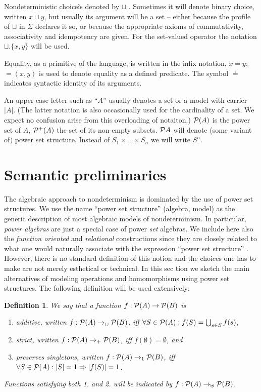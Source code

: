 \documentclass[10pt]{article}
\newcommand{\ch}{\sqcup}
\newcommand{\Car}[1]{|#1|}
\newcommand{\PSet}{{\cal P}}
\newcommand{\impl}{\mathrel{\Rightarrow}}
\newcommand{\into}{\mathrel{\rightarrow}}
\newcommand{\addinto}{\mathrel{\rightarrow_{\cup}}}
\newcommand{\strinto}{\mathrel{\rightarrow_{+}}}
\newcommand{\singinto}{\mathrel{\rightarrow_{1}}}
\newcommand{\addstrinto}{\mathrel{\rightarrow_{\uplus}}}
\newcommand{\es}{\emptyset}
\newcommand{\MyLPar}{\parsep -.2ex plus.2ex minus.2ex\itemsep\parsep 
\vspace{-\topsep}\vspace{.5ex}}
\newenvironment{enum}{\begin{enumerate}\MyLPar}{\end{enumerate}}
\newcounter{CLAIM}[section]
\newtheorem{Definition}[CLAIM]{Definition}
\begin{document}
Nondeterministic choice\~is 
denoted by $\ch$ . Sometimes it will denote binary 
choice, written  $x\ch y$, but usually its argument will be a set 
 -- either because the profile of $\ch$ in $\Sigma$ declares it 
so, or because the appropriate axioms of commutativity, associativity 
and idempotency are given. For the set-valued operator the notation 
$\ch.\{x,y\}$ will be used. 

Equality, as a primitive of the language, is written in the infix 
notation,  $x=y$; $=(x,y)$ is used to denote equality as a 
defined predicate. The symbol $\doteq$ 
 indicates syntactic identity of its arguments. 
 
 
An upper case letter such as ``$A$''  usually 
denotes a set or a model with carrier $\Car A$. 
(The latter notation is also occasionally used for the cardinality 
of a set. We expect no confusion arise from this overloading of 
notaiton.) 
$\PSet(A)$ is the power set of $A$,  $\PSet^{+}(A)$ the set of its 
non-empty subsets.  $\PSet A$ will denote (some variant of) power set 
structure. 
Instead of $S_{1}\times\ldots\times S_{n}$ we will write $S^{n}$.


\section{Semantic preliminaries}
The algebraic approach to 
nondeterminism is dominated by the use of power set structures. We 
use the name ``power set structure'' 
 (algebra, model) as the generic description of most algebraic models 
of nondeterminism. In particular, {\em power algebras} are just a 
special case of power {\em set} algebras. We include here also the {\em 
function oriented} and {\em relational}
 constructions since they are closely related to what one would 
naturally associate with the expression ``power set 
structure'' 
. However, there is no standard definition of this notion and the 
choices one has to make are not merely esthetical or technical. In 
this sec
tion we sketch the main alternatives of modeling operations and 
homomorphisms using power set structures. The following definition 
will be used extensively:
\begin{Definition}  %
We say that a function $f:\PSet(A)\into\PSet(B)$ is  
\begin{enum}
\item {\em additive}, written $f:\PSet(A)\addinto\PSet(B)$,   iff   
$\forall S\in\PSet(A) : f(S)=\bigcup_{s\in S}f(s)$,
\item {\em strict}, written $f:\PSet(A)\strinto\PSet(B)$, iff 
$f(\es)=\es$, and
\item {\em preserves singletons}, written 
$f:\PSet(A)\singinto\PSet(B)$, iff $\forall S\in\PSet(A):\Car 
S=1\impl\Car{f(S)}=1$.
\end{enum}
%
Functions satisfying both 1. and 2. will be indicated by 
$f:\PSet(A)\addstrinto\PSet(B)$.
\end{Definition}
\end{document}
